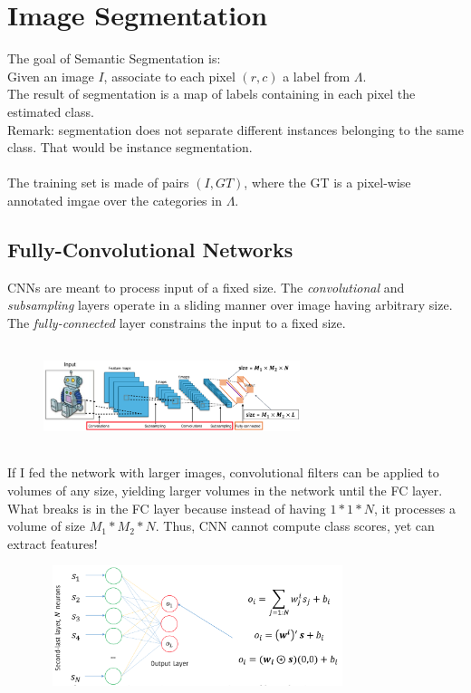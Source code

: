 \section{Image Segmentation}
The goal of Semantic Segmentation is: \\
Given an image $I$, associate to each pixel $(r,c)$ a label from $\Lambda$. \\
The result of segmentation is a map of labels containing in each pixel the estimated class.\\

Remark: segmentation does not separate different instances belonging to the same class. That would be instance segmentation. \\ \\
The training set is made of pairs $(I,GT)$, where the GT is a pixel-wise annotated imgae over the categories in $\Lambda$.

\subsection{Fully-Convolutional Networks}
CNNs are meant to process input of a fixed size. The \textit{convolutional} and \textit{subsampling} layers operate in a sliding manner over image having arbitrary size. The \textit{fully-connected} layer constrains the input to a fixed size. \\

\begin{figure}
    \includegraphics[width=7.5cm, height=3cm]{images/cnn_segm.png}
\end{figure}  

If I fed the network with larger images, convolutional filters can be applied to volumes of any size, yielding larger volumes in the network until the FC layer. What breaks is in the FC layer because instead of having $1*1*N$, it processes a volume of size $M_1 * M_2 * N$. Thus, CNN cannot compute class scores, yet can extract features!

\begin{figure}
    \includegraphics[width=9cm, height=3.5cm]{images/fc_to_cnn.png}
\end{figure}  

